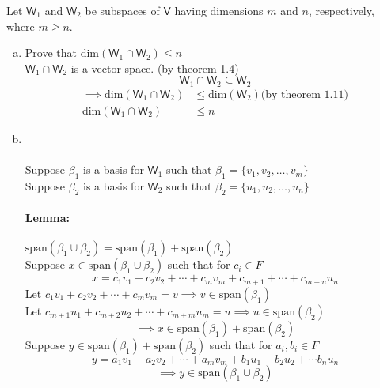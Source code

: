 Let $\mathsf{W}_1$ and $\mathsf{W}_2$ be subspaces of $\mathsf{V}$
having dimensions $m$ and $n$, respectively, where $m\geq n$.
\begin{enumerate}[(a)]
\item Prove that $\text{dim}(\mathsf{W}_1\cap\mathsf{W}_2) \leq n$
\\$\mathsf{W}_1\cap\mathsf{W}_2$ is a vector space. (by theorem 1.4)
\begin{equation}
\mathsf{W}_1\cap\mathsf{W}_2 \subseteq \mathsf{W}_2
\end{equation}
\begin{align}
\implies \text{dim}(\mathsf{W}_1\cap\mathsf{W}_2) &\leq
\text{dim}(\mathsf{W}_2) \text{(by theorem 1.11)}\\
\text{dim}(\mathsf{W}_1\cap\mathsf{W}_2) &\leq n
\end{align}

\item \hfill\\
\\Suppose $\beta_1$ is a basis for $\mathsf{W}_1$ such that
$\beta_1=\{v_1,v_2,\dots,v_m\}$
\\Suppose $\beta_2$ is a basis for $\mathsf{W}_2$ such that
$\beta_2=\{u_1,u_2,\dots,u_n\}$
\paragraph{Lemma:} $\text{span}(\beta_1\cup \beta_2) =
\text{span}(\beta_1) + \text{span}(\beta_2)$
\\Suppose $x\in \text{span}(\beta_1\cup\beta_2)$ such that for $c_i
\in F$ 
\[x=c_1v_1+c_2v_2+\cdots+c_mv_m +c_{m+1} +\cdots+c_{m+n}u_n\]
Let $c_1v_1+c_2v_2+\cdots+c_mv_m = v \implies v \in
\text{span}(\beta_1)$
\\Let $c_{m+1}u_1+c_{m+2}u_2+\cdots+c_{m+m}u_m = u \implies u \in
\text{span}(\beta_2)$
\begin{equation}
\implies x\in \text{span}(\beta_1) + \text{span}(\beta_2)
\end{equation}
Suppose $y\in \text{span}(\beta_1) + \text{span}(\beta_2)$ such that
for $a_i,b_i \in F$ 
\[y = a_1v_1+a_2v_2+\cdots+a_mv_m+b_1u_1+b_2u_2+\cdots b_nu_n \]
\begin{equation}
\implies y \in \text{span}(\beta_1\cup\beta_2)
\end{equation}

\end{enumerate}
